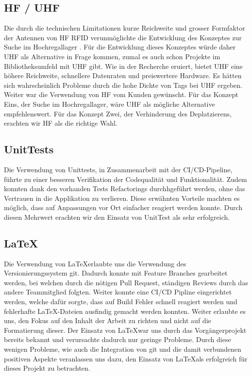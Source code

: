 \subsection{HF / UHF}
Die durch die technischen Limitationen kurze Reichweite und grosser Formfaktor der Antennen von \gls{HF} \gls{RFID} verunmöglichte die Entwicklung des Konzeptes zur Suche im Hochregallager \parencite{finkenzeller2015rfid}. Für die Entwicklung dieses Konzeptes würde daher \gls{UHF} als Alternative in Frage kommen, zumal es auch schon Projekte im Bibliotheksumfeld mit \gls{UHF} gibt. Wie in der Recherche eruiert, bietet \gls{UHF} eine höhere Reichweite, schnellere Datenraten und preiswertere Hardware. Es hätten sich wahrscheinlich Probleme durch die hohe Dichte von Tags bei \gls{UHF} ergeben. Weiter war die Verwendung von \gls{HF} vom Kunden gewünscht. Für das Konzept Eins, der Suche im Hochregallager, wäre \gls{UHF} als mögliche Alternative empfehlenswert. Für das Konzept Zwei, der Verhinderung des Deplatzierens, erachten wir \gls{HF} als die richtige Wahl.

\subsection{UnitTests}
Die Verwendung von Unittests, in Zusammenarbeit mit der CI/CD-Pipeline, führte zu einer besseren Verifikation der Codequalität und Funktionalität. Zudem konnten dank den vorhanden Tests Refactorings durchhgeführt werden, ohne das Vertrauen in die Applikation zu verlieren. Diese erwähnten Vorteile machten es möglich, dass auf Anpassungen vor Ort einfacher reagiert werden konnte. Durch diesen Mehrwert erachten wir den Einsatz von UnitTest als sehr erfolgreich.

\subsection{\LaTeX}
Die Verwendung von \LaTeX erlaubte uns die Verwendung des Versionierungssystem git. Dadurch konnte mit Feature Branches gearbeitet werden, bei welchen durch die nötigen Pull Request, ständigen Reviews durch das andere Teammitglied folgten. Weiter konnte eine CI/CD Pipline eingerichtet werden, welche dafür sorgte, dass auf Build Fehler schnell reagiert werden und fehlerhafte \LaTeX-Dateien ausfindig gemacht werden konnten. Weiter erlaubte es uns, den Fokus auf den Inhalt der Arbeit zu richten und nicht auf die Formatierung dieser. Der Einsatz von \LaTeX war uns durch das Vorgängerprojekt bereits bekannt und verursachte dadurch nur geringe Probleme. Durch diese wenigen Probleme, wie auch die Integration von git und die damit verbundenen positiven Aspekte veranlassen uns dazu, den Einsatz von \LaTeX als erfolgreich für dieses Projekt zu betrachten.

